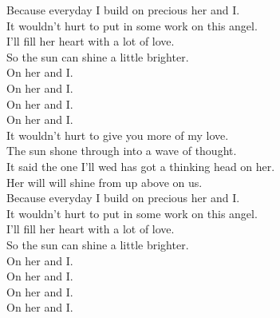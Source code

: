 Because everyday I build on precious her and I. \\
It wouldn't hurt to put in some work on this angel. \\
I'll fill her heart with a lot of love. \\
So the sun can shine a little brighter. \\

On her and I. \\
On her and I. \\
On her and I. \\
On her and I. \\

It wouldn't hurt to give you more of my love. \\
The sun shone through into a wave of thought. \\
It said the one I'll wed has got a thinking head on her. \\
Her will will shine from up above on us. \\

Because everyday I build on precious her and I. \\
It wouldn't hurt to put in some work on this angel. \\
I'll fill her heart with a lot of love. \\
So the sun can shine a little brighter. \\

On her and I. \\
On her and I. \\
On her and I. \\
On her and I. \\
